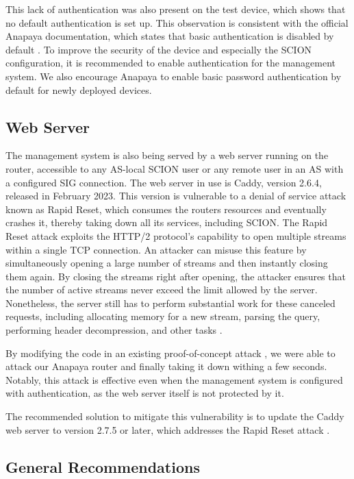 This lack of authentication was also present on the test device, which shows that no default authentication is set up.
This observation is consistent with the official Anapaya documentation, which states that basic authentication is disabled by default \cite{anapayaManagemenDoc}.
To improve the security of the device and especially the SCION configuration, it is recommended to enable authentication for the management system.
We also encourage Anapaya to enable basic password authentication by default for newly deployed devices.


\subsection{Web Server}
The management system is also being served by a web server running on the router, accessible to any AS-local SCION user or any remote user in an AS with a configured SIG connection.
The web server in use is Caddy, version 2.6.4, released in February 2023.
This version is vulnerable to a denial of service attack known as Rapid Reset, which consumes the routers resources and eventually crashes it, thereby taking down all its services, including SCION.
The Rapid Reset attack exploits the HTTP/2 protocol's capability to open multiple streams within a single TCP connection.
An attacker can misuse this feature by simultaneously opening a large number of streams and then instantly closing them again.
By closing the streams right after opening, the attacker ensures that the number of active streams never exceed the limit allowed by the server.
Nonetheless, the server still has to perform substantial work for these canceled requests, including allocating memory for a new stream, parsing the query, performing header decompression, and other tasks \cite{googleWorksNovel}.

By modifying the code in an existing proof-of-concept attack \cite{githubGitHubMicrictorhttp2rststream}, we were able to attack our Anapaya router and finally taking it down withing a few seconds.
Notably, this attack is effective even when the management system is configured with authentication, as the web server itself is not protected by it.

The recommended solution to mitigate this vulnerability is to update the Caddy web server to version 2.7.5 or later, which addresses the Rapid Reset attack \cite{githubReleasesCaddyservercaddy}.



\subsection{General Recommendations}

